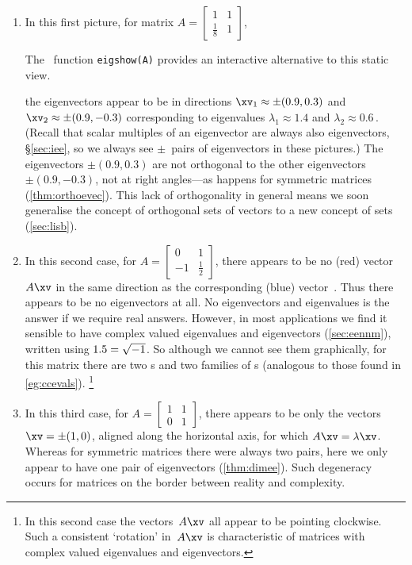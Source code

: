 \begin{enumerate}
\item 
In this first picture, for matrix
\( A=\begin{bmatrix} 1&1\\\tfrac18&1 \end{bmatrix}\),
%
\begin{aside}
The \script[1]\ function \texttt{eigshow(A)} provides an interactive alternative to this static view.
\end{aside}%
the eigenvectors appear to be in directions \(\xv_1\approx\pm(0.9,0.3)\) and \(\xv_2\approx\pm(0.9,-0.3)\) corresponding to eigenvalues \(\lambda_1\approx1.4\) and \(\lambda_2\approx 0.6\)\,.
(Recall that scalar multiples of an eigenvector are always also eigenvectors, \S\ref{sec:iee}, so we always see \(\pm\)~pairs of eigenvectors in these pictures.)
The eigenvectors \(\pm(0.9,0.3)\) are not orthogonal to the other eigenvectors \(\pm(0.9,-0.3)\), not at right angles---as happens for symmetric matrices (\autoref{thm:orthoevec}).
This lack of orthogonality in general means we soon generalise the concept of orthogonal sets of vectors to a new concept of  sets (\autoref{sec:lisb}).

\item 
In this second case, for
\( A=\begin{bmatrix} 0&1\\-1&\tfrac12 \end{bmatrix}\), %
there appears to be no (red) vector~\(A\xv\) in the same direction as the corresponding (blue) vector~\xv.
Thus there appears to be no eigenvectors at all.
No eigenvectors and eigenvalues is the answer if we require real answers.
However, in most applications we find it sensible to have complex valued eigenvalues and eigenvectors (\autoref{sec:eennm}), written using \(1.5=\sqrt{-1}\).
So although we cannot see them graphically, for this matrix there are two s and two families of s (analogous to those found in \autoref{eg:ccevals}). 
\footnote{In this second case the vectors~\(A\xv\) all appear to be pointing clockwise.  
Such a consistent `rotation' in~\(A\xv\) is characteristic of matrices with complex valued eigenvalues and eigenvectors.}

\item 
In this third case, for
\( A=\begin{bmatrix} 1&1\\0&1 \end{bmatrix}\),
%
there appears to be only the vectors \(\xv=\pm(1,0)\), aligned along the horizontal axis, for which \(A\xv=\lambda\xv\).
Whereas for symmetric matrices there were always two pairs, here we only appear to have one pair of eigenvectors (\autoref{thm:dimee}).
Such degeneracy occurs for matrices on the border between reality and complexity.

\end{enumerate}


